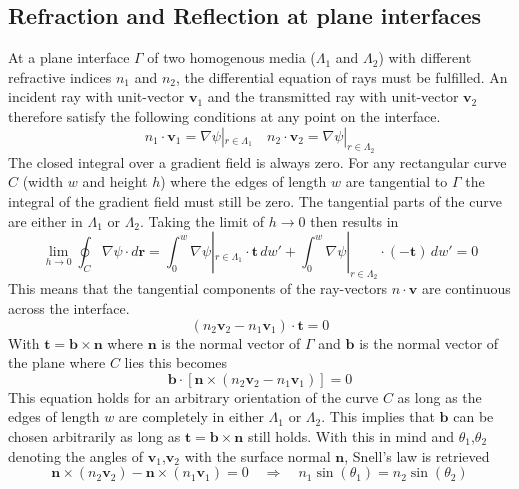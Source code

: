 \subsection{Refraction and Reflection at plane interfaces}
At a plane interface \(\Gamma \) of two homogenous media (\(\Lambda_1\) and \(\Lambda_2\)) with different refractive indices \(n_1\) and \(n_2\), the differential equation of rays must be fulfilled.
An incident ray with unit-vector \(\bm{v}_1\) and the transmitted ray with unit-vector \(\bm{v}_2\) therefore satisfy the following conditions at any point on the interface.
\begin{equation}
    n_1 \cdot \bm{v}_1 = \nabla \psi|_{r \in \Lambda_1 } \quad n_2 \cdot \bm{v}_2 = \nabla \psi|_{r \in \Lambda_2 } 
\end{equation}
The closed integral over a gradient field is always zero.
For any rectangular curve \(C\) (width \(w\) and height \(h\)) where the edges of length \(w\) are tangential to \(\Gamma \) the integral of the gradient field must still be zero.
The tangential parts of the curve are either in \(\Lambda_1\) or \(\Lambda_2\).
Taking the limit of \(h \to 0\) then results in~\parencite{born_foundations_1999}
\begin{equation}
    \lim_{h \to 0} \oint_C \nabla \psi \cdot d\bm{r} = \int_{0}^{w} \nabla \psi|_{r \in \Lambda_1 } \cdot \bm{t} \, dw' + \int_{0}^{w} \nabla \psi|_{r \in \Lambda_2 } \cdot (-\bm{t}) \, dw' = 0
\end{equation}
This means that the tangential components of the ray-vectors \(n \cdot \bm{v}\) are continuous across the interface.
\begin{equation}
    (n_2 \bm{v}_2 - n_1 \bm{v}_1) \cdot \bm{t} = 0
\end{equation}
With \(\bm{t} = \bm{b} \times \bm{n}\) where \(\bm{n}\) is the normal vector of \(\Gamma \) and \(\bm{b}\) is the normal vector of the plane where \(C\) lies this becomes
\begin{equation}
    \bm{b} \cdot [\bm{n} \times (n_2 \bm{v}_2 - n_1 \bm{v}_1)] = 0
\end{equation}
This equation holds for an arbitrary orientation of the curve \(C\) as long as the edges of length \(w\) are completely in either \(\Lambda_1\) or \(\Lambda_2\).
This implies that \(\bm{b}\) can be chosen arbitrarily as long as \(\bm{t} = \bm{b} \times \bm{n}\) still holds.
With this in mind and \(\theta_1\),\(\theta_2\) denoting the angles of \(\bm{v}_1\),\(\bm{v}_2\) with the surface normal \(\bm{n}\), Snell's law is retrieved
\begin{equation}
    \bm{n} \times (n_2\bm{v}_2) - \bm{n} \times (n_1\bm{v}_1) = 0 \quad \Rightarrow \quad n_1 \sin(\theta_1) = n_2 \sin(\theta_2)
\end{equation}

